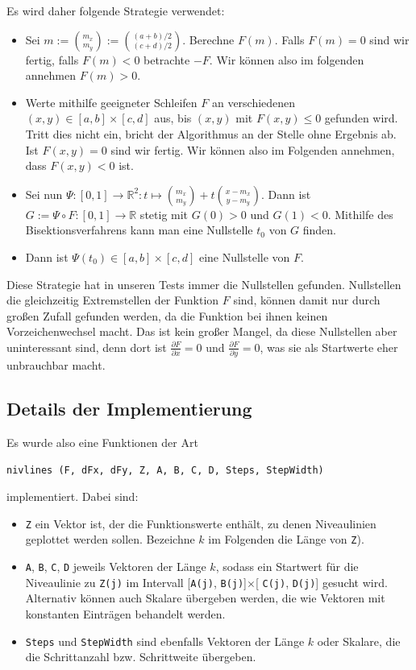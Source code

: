 \documentclass[a4paper,11pt,bibliography=totoc,listof=totoc,headinclude=true,cleardoublepage=empty,oneside]{scrartcl}
\newcommand{\R}{\mathbb{R}}
\newcommand{\diff}[2]{\frac{\partial #1}{\partial #2}}
\begin{document}
Es wird daher folgende Strategie verwendet:
\begin{itemize}
	\item Sei $m:= \binom{m_x}{m_y} := \binom{(a+b)/2}{(c+d)/2}$. Berechne $F(m)$. Falls $F(m)=0$ sind wir fertig, falls $F(m)<0$ betrachte $-F$. Wir können also im folgenden annehmen $F(m)>0$.
	\item Werte mithilfe geeigneter Schleifen $F$ an verschiedenen $(x,y) \in [a,b]\times [c,d]$ aus, bis $(x,y)$ mit $F(x,y)\le 0$ gefunden wird. Tritt dies nicht ein, bricht der Algorithmus an der Stelle ohne Ergebnis ab. Ist $F(x,y)=0$ sind wir fertig. Wir können also im Folgenden annehmen, dass $F(x,y)<0$ ist.
	\item Sei nun $\Psi : [0,1] \to \R^2 : t \mapsto \binom{m_x}{m_y} + t \binom{x-m_x}{y-m_y}$. Dann ist $ G:= \Psi \circ F : [0,1] \to \R$ stetig mit $G(0)>0$ und $G(1)<0$. Mithilfe des Bisektionsverfahrens kann man eine Nullstelle $t_0$ von $G$ finden.
	\item Dann ist $\Psi(t_0) \in [a,b] \times [c,d]$ eine Nullstelle von $F$.
\end{itemize} 
Diese Strategie hat in unseren Tests immer die Nullstellen gefunden. Nullstellen die gleichzeitig Extremstellen der Funktion $F$ sind, können damit nur durch großen Zufall gefunden werden, da die Funktion bei ihnen keinen Vorzeichenwechsel macht. Das ist kein großer Mangel, da diese Nullstellen aber uninteressant sind, denn dort ist $\diff{F}{x}=0$ und $\diff{F}{y}=0$, was sie als Startwerte eher unbrauchbar macht.

\subsection{Details der Implementierung}

Es wurde also eine Funktionen der Art
\begin{verbatim}
nivlines (F, dFx, dFy, Z, A, B, C, D, Steps, StepWidth)
\end{verbatim}
implementiert. Dabei sind:
\begin{itemize}
	\item \verb|Z| ein Vektor ist, der die Funktionswerte enthält, zu denen Niveaulinien geplottet werden sollen. Bezeichne $k$ im Folgenden die Länge von \verb|Z|).
	\item \verb|A|, \verb|B|, \verb|C|, \verb|D| jeweils Vektoren der Länge $k$, sodass ein Startwert für die Niveaulinie zu \verb|Z(j)| im Intervall [\verb|A(j)|, \verb|B(j)|]$\times$[ \verb|C(j)|, \verb|D(j)|] gesucht wird. Alternativ können auch Skalare übergeben werden, die wie Vektoren mit konstanten Einträgen behandelt werden.
	\item  \verb|Steps| und \verb|StepWidth| sind ebenfalls Vektoren der Länge $k$ oder Skalare, die die Schrittanzahl bzw. Schrittweite übergeben.
\end{itemize}
\end{document}
